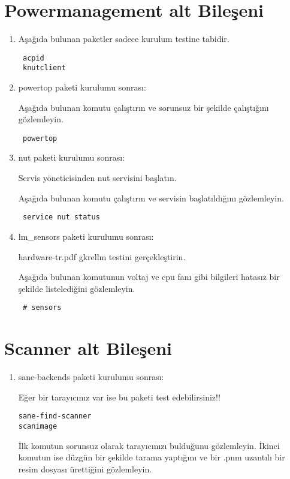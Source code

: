 \documentclass[a4paper,10pt]{article}
\begin{document}
\section{Powermanagement alt Bileşeni}
\begin{enumerate}
\item Aşağıda bulunan paketler sadece kurulum testine tabidir.
\begin{verbatim}
 acpid
 knutclient
\end{verbatim}

\item powertop paketi kurulumu sonrası:

Aşağıda bulunan komutu çalıştırın ve sorunsuz bir şekilde çalıştığını gözlemleyin.

\begin{verbatim}
 powertop
\end{verbatim}

\item nut paketi kurulumu sonrası:

Servis yöneticisinden nut servisini başlatın.

Aşağıda bulunan komutu çalıştırın ve servisin başlatıldığını gözlemleyin. 
\begin{verbatim}
 service nut status
\end{verbatim}


 \item lm\_sensors paketi kurulumu sonrası:

hardware-tr.pdf gkrellm testini gerçekleştirin.

Aşağıda bulunan komutunun voltaj ve cpu fanı gibi bilgileri hatasız bir şekilde listelediğini gözlemleyin.
\begin{verbatim}
 # sensors 
\end{verbatim}

\end{enumerate}

\section{Scanner alt Bileşeni}
\begin{enumerate}
\item sane-backends paketi kurulumu sonrası:

Eğer bir tarayıcınız var ise bu paketi test edebilirsiniz!!
\begin{verbatim}
sane-find-scanner
scanimage 
\end{verbatim}

İlk komutun sorunsuz olarak tarayıcınızı bulduğunu gözlemleyin.
İkinci komutun ise düzgün bir şekilde tarama yaptığını ve bir .pnm uzantılı bir resim dosyası ürettiğini gözlemleyin.

\end{enumerate}
\end{document}
